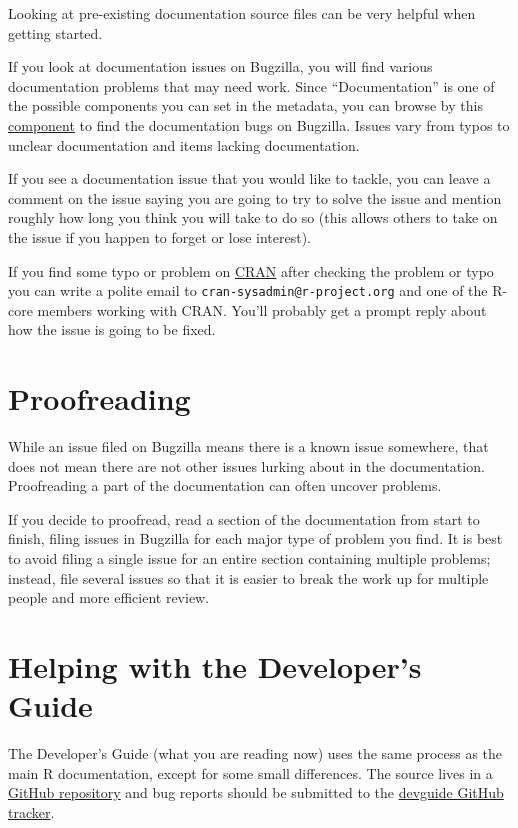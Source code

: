 \documentclass[
]{book}
\begin{document}
Looking at pre-existing documentation source files can be very helpful when getting started.

If you look at documentation issues on Bugzilla, you will find various documentation problems that may need work. Since ``Documentation'' is one of the possible components you can set in the metadata, you can browse by this \href{https://bugs.r-project.org/bugzilla/buglist.cgi?component=Documentation}{component} to find the documentation bugs on Bugzilla. Issues vary from typos to unclear documentation and items lacking documentation.

If you see a documentation issue that you would like to tackle, you can leave a comment on the issue saying you are going to try to solve the issue and mention roughly how long you think you will take to do so (this allows others to take on the issue if you happen to forget or lose interest).

If you find some typo or problem on \href{https://cran.r-project.org}{CRAN} after checking the problem or typo you can write a polite email to \texttt{cran-sysadmin@r-project.org} and one of the R-core members working with CRAN. You'll probably get a prompt reply about how the issue is going to be fixed.

\hypertarget{proofreading}{%
\section{Proofreading}\label{proofreading}}

While an issue filed on Bugzilla means there is a known issue somewhere, that does not mean there are not other issues lurking about in the documentation. Proofreading a part of the documentation can often uncover problems.

If you decide to proofread, read a section of the documentation from start to finish, filing issues in Bugzilla for each major type of problem you find. It is best to avoid filing a single issue for an entire section containing multiple problems; instead, file several issues so that it is easier to break the work up for multiple people and more efficient review.

\hypertarget{helping-with-the-developers-guide}{%
\section{Helping with the Developer's Guide}\label{helping-with-the-developers-guide}}

The Developer's Guide (what you are reading now) uses the same process as the main R documentation, except for some small differences. The source lives in a \href{https://github.com/r-devel/rdevguide/}{GitHub repository} and bug reports should be submitted to the \href{https://github.com/r-devel/rdevguide/issues}{devguide GitHub tracker}.
\end{document}
